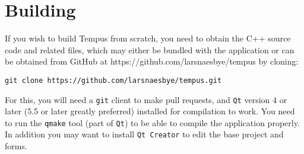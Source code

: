 \section{Building}

If you wish to build Tempus from scratch, you need to obtain the C++ source code and related files, which may either be bundled with the application or can be obtained from GitHub at https://github.com/larsnaesbye/tempus by cloning:

\texttt{git clone https://github.com/larsnaesbye/tempus.git}

For this, you will need a \texttt{git} client to make pull requests, and \texttt{Qt} version 4 or later (5.5 or later greatly preferred) installed for compilation to work. 
You need to run the \texttt{qmake} tool (part of \texttt{Qt}) to be able to compile the application properly. In addition you may want to install \texttt{Qt Creator} to edit the base project and forms.